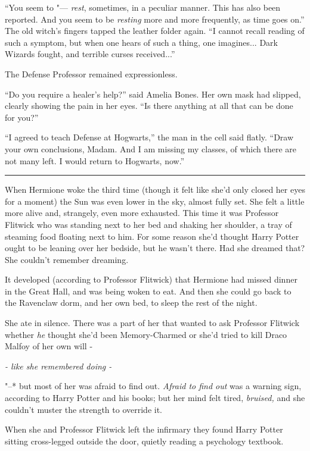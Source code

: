 ``You seem to "--- \emph{rest}, sometimes, in a peculiar manner. This has
also been reported. And you seem to be \emph{resting} more and more
frequently, as time goes on.'' The old witch's fingers tapped the
leather folder again. ``I cannot recall reading of such a symptom, but
when one hears of such a thing, one imagines... Dark Wizards
fought, and terrible curses received...''

The Defense Professor remained expressionless.

``Do you require a healer's help?'' said Amelia Bones. Her own mask had
slipped, clearly showing the pain in her eyes. ``Is there anything at
all that can be done for you?''

``I agreed to teach Defense at Hogwarts,'' the man in the cell said
flatly. ``Draw your own conclusions, Madam. And I am missing my classes,
of which there are not many left. I would return to Hogwarts, now.''

\begin{center}\rule{3in}{0.4pt}\end{center}

When Hermione woke the third time (though it felt like she'd only closed
her eyes for a moment) the Sun was even lower in the sky, almost fully
set. She felt a little more alive and, strangely, even more exhausted.
This time it was Professor Flitwick who was standing next to her bed and
shaking her shoulder, a tray of steaming food floating next to him. For
some reason she'd thought Harry Potter ought to be leaning over her
bedside, but he wasn't there. Had she dreamed that? She couldn't
remember dreaming.

It developed (according to Professor Flitwick) that Hermione had missed
dinner in the Great Hall, and was being woken to eat. And then she could
go back to the Ravenclaw dorm, and her own bed, to sleep the rest of the
night.

She ate in silence. There was a part of her that wanted to ask Professor
Flitwick whether \emph{he} thought she'd been Memory-Charmed or she'd
tried to kill Draco Malfoy of her own will -

\emph{- like she remembered doing -}

"--* but most of her was afraid to find out. \emph{Afraid to find out} was
a warning sign, according to Harry Potter and his books; but her mind
felt tired, \emph{bruised,} and she couldn't muster the strength to
override it.

When she and Professor Flitwick left the infirmary they found Harry
Potter sitting cross-legged outside the door, quietly reading a
psychology textbook.

